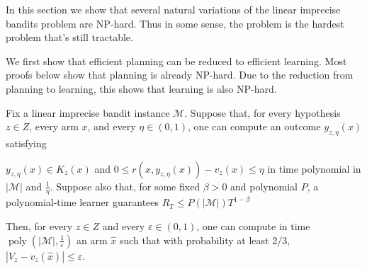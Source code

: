 {In this section we show that several natural variations of the linear imprecise bandits problem are NP-hard. Thus in some sense, the problem is
the hardest problem that's still tractable.

We first show that efficient planning can be reduced to efficient learning.
Most proofs below show that planning is already NP-hard. Due to the reduction
from planning to learning, this shows that learning is also NP-hard.


\begin{lemma}\label{lem:planning-from-learning}

  {
  Fix a linear imprecise bandit instance $\mathcal{M}$.
  Suppose that, for every hypothesis $z \in Z$, every arm $x$, and every $\eta \in \left( 0 , 1 \right)$, one can compute an outcome
  $y_{z , \eta} \left( x \right)$ satisfying
  }

  {
  $y_{z , \eta} \left( x \right) \in K_{z} \left( x \right)$ and $0 \le r \left( x , y_{z , \eta} \left( x \right) \right) - v_{z} \left( x \right) \le \eta$
  in time polynomial in $| \mathcal{M} |$ and $\frac{1}{\eta}$.
  Suppose also that, for some fixed $\beta > 0$ and polynomial $P$, a
  polynomial-time learner guarantees
  }
  {$R_{T} \le P \left( | \mathcal{M} | \right) T^{1 - \beta}$}

  {
  Then, for every $z \in Z$ and every $\varepsilon \in \left( 0 , 1 \right)$, one can compute in
  time $\operatorname{poly} \left( | \mathcal{M} | , \frac{1}{\varepsilon} \right)$ an arm $\hat{x}$ such
  that with probability at least 2/3, $| V_{z} - v_{z} \left( \hat{x} \right) | \le \varepsilon$.
  }
\end{lemma}


}
